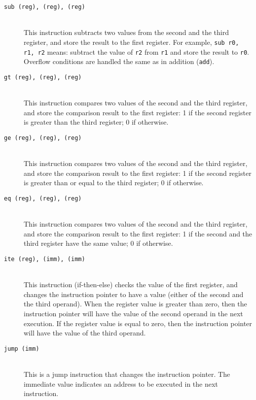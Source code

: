 \documentclass[a4paper, 11pt]{article}
\theoremstyle{definition}
\begin{document}
{\begin{description}
  \item [\texttt{sub (reg), (reg), (reg)}]~\\
    This instruction subtracts two values from the second and the
    third register, and store the result to the first register. For
    example, \texttt{sub r0, r1, r2} means: subtract the value of
    \texttt{r2} from \texttt{r1} and store the result to \texttt{r0}.
    Overflow conditions are handled the same as in addition
    (\texttt{add}).

  \item [\texttt{gt (reg), (reg), (reg)}]~\\
    This instruction compares two values of the second and
    the third register, and store the comparison result to the first
    register: 1 if the second register is greater than the third
    register; 0 if otherwise.

  \item [\texttt{ge (reg), (reg), (reg)}]~\\
    This instruction compares two values of the second and
    the third register, and store the comparison result to the first
    register: 1 if the second register is greater than or equal to the
    third register; 0 if otherwise.

  \item [\texttt{eq (reg), (reg), (reg)}]~\\
    This instruction compares two values of the second and
    the third register, and store the comparison result to the first
    register: 1 if the second and the third register have the same
    value; 0 if otherwise.

  \item [\texttt{ite (reg), (imm), (imm)}]~\\
    This instruction (if-then-else) checks the value of the first
    register, and changes the instruction pointer to have a value
    (either of the second and the third operand). When the register
    value is greater than zero, then the instruction pointer will have
    the value of the second operand in the next execution.  If the
    register value is equal to zero, then the instruction pointer will
    have the value of the third operand.

  \item [\texttt{jump (imm)}]~\\
    This is a jump instruction that changes the instruction pointer.
    The immediate value indicates an address to be executed in the
    next instruction.


\end{description}}
\end{document}
